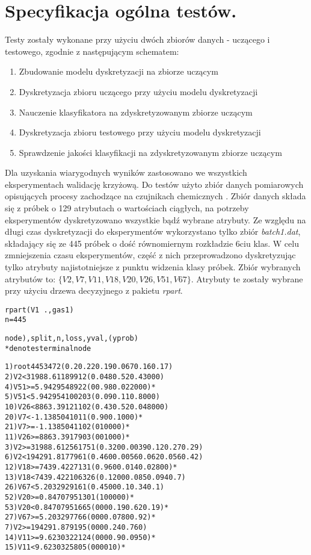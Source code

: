 \section{Specyfikacja ogólna testów.}
 Testy zostały wykonane przy użyciu dwóch zbiorów danych - uczącego i testowego, zgodnie z następującym schematem:
\begin{enumerate}
	\item{Zbudowanie modelu dyskretyzacji na zbiorze uczącym}
	\item{Dyskretyzacja zbioru uczącego przy użyciu modelu dyskretyzacji}
	\item{Nauczenie klasyfikatora na zdyskretyzowanym zbiorze uczącym}
	\item{Dyskretyzacja zbioru testowego przy użyciu modelu dyskretyzacji}
	\item{Sprawdzenie jakości klasyfikacji na zdyskretyzowanym zbiorze uczącym}
\end{enumerate}
Dla uzyskania wiarygodnych wyników zastosowano we wszystkich eksperymentach walidację krzyżową. Do testów użyto zbiór danych pomiarowych opisujących procesy zachodzące na czujnikach chemicznych \cite{Gas:2012}. Zbiór danych składa się z próbek o 129 atrybutach o wartościach ciągłych, na potrzeby eksperymentów dyskretyzowano wszystkie bądź wybrane atrybuty. Ze względu na długi czas dyskretyzacji do eksperymentów wykorzystano tylko zbiór \emph{batch1.dat}, składający się ze 445 próbek o dość równomiernym rozkładzie 6ciu klas. W celu zmniejszenia czasu eksperymentów, część z nich przeprowadzono dyskretyzując tylko atrybuty najistotniejsze z punktu widzenia klasy próbek. Zbiór wybranych atrybutów to: $\{V2, V7, V11, V18, V20, V26, V51, V67\}$. Atrybuty te zostały wybrane przy użyciu drzewa decyzyjnego z pakietu \emph{rpart}.

\newpage
\begin{alltt}
rpart(V1 ~ ., gas1)
n= 445 

node), split, n, loss, yval, (yprob)
      * denotes terminal node

 1) root 445 347 2 (0.2 0.22 0.19 0.067 0.16 0.17)  
   2) V2< 31988.61 189  91 2 (0.048 0.52 0.43 0 0 0)  
     4) V51>=5.942954 89   2 2 (0 0.98 0.022 0 0 0) *
     5) V51< 5.942954 100  20 3 (0.09 0.11 0.8 0 0 0)  
      10) V26< 8863.391 21  10 2 (0.43 0.52 0.048 0 0 0)  
        20) V7< -1.138504 10   1 1 (0.9 0 0.1 0 0 0) *
        21) V7>=-1.138504 11   0 2 (0 1 0 0 0 0) *
      11) V26>=8863.391 79   0 3 (0 0 1 0 0 0) *
   3) V2>=31988.61 256 175 1 (0.32 0 0.0039 0.12 0.27 0.29)  
     6) V2< 194291.8 177  96 1 (0.46 0 0.0056 0.062 0.056 0.42)  
      12) V18>=7439.422 71   3 1 (0.96 0 0.014 0.028 0 0) *
      13) V18< 7439.422 106  32 6 (0.12 0 0 0.085 0.094 0.7)  
        26) V67< 5.20329 29  16 1 (0.45 0 0 0.1 0.34 0.1)  
          52) V20>=0.8470795 13   0 1 (1 0 0 0 0 0) *
          53) V20< 0.8470795 16   6 5 (0 0 0 0.19 0.62 0.19) *
        27) V67>=5.20329 77   6 6 (0 0 0 0.078 0 0.92) *
     7) V2>=194291.8 79  19 5 (0 0 0 0.24 0.76 0)  
      14) V11>=9.623032 21   2 4 (0 0 0 0.9 0.095 0) *
      15) V11< 9.623032 58   0 5 (0 0 0 0 1 0) *
\end{alltt}



